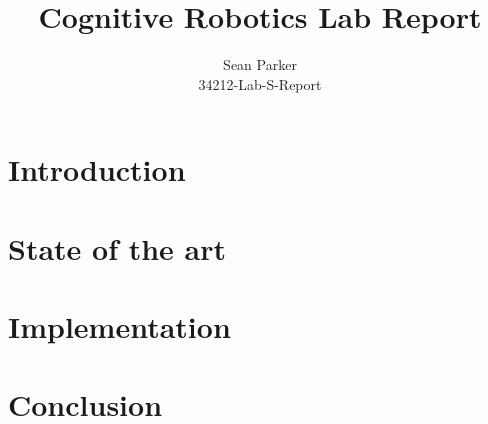 \documentclass[12pt]{article}
\title{Cognitive Robotics Lab Report}
\author{Sean Parker\\
34212-Lab-S-Report}
\begin{document}
\maketitle

\section{Introduction}

\section{State of the art}

\section{Implementation}

\section{Conclusion}



\end{document}
